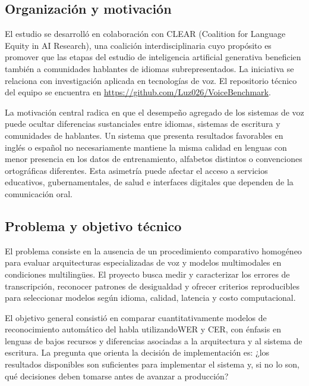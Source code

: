 \documentclass[11pt,letterpaper]{article}
\begin{document}
\subsection{Organización y motivación}
El estudio se desarrolló en colaboración con CLEAR (Coalition for Language Equity in AI Research), una coalición interdisciplinaria cuyo propósito es promover que las etapas del estudio de inteligencia artificial generativa beneficien también a comunidades hablantes de idiomas subrepresentados. La iniciativa se relaciona con investigación aplicada en tecnologías de voz. El repositorio técnico del equipo se encuentra en \url{https://github.com/Luz026/VoiceBenchmark}.

La motivación central radica en que el desempeño agregado de los sistemas de voz puede ocultar diferencias sustanciales entre idiomas, sistemas de escritura y comunidades de hablantes. Un sistema que presenta resultados favorables en inglés o español no necesariamente mantiene la misma calidad en lenguas con menor presencia en los datos de entrenamiento, alfabetos distintos o convenciones ortográficas diferentes. Esta asimetría puede afectar el acceso a servicios educativos, gubernamentales, de salud e interfaces digitales que dependen de la comunicación oral.

\subsection{Problema y objetivo técnico}
El problema consiste en la ausencia de un procedimiento comparativo homogéneo para evaluar arquitecturas especializadas de voz y modelos multimodales en condiciones multilingües. El proyecto busca medir y caracterizar los errores de transcripción, reconocer patrones de desigualdad y ofrecer criterios reproducibles para seleccionar modelos según idioma, calidad, latencia y costo computacional.

El objetivo general consistió en comparar cuantitativamente modelos de reconocimiento automático del habla utilizandoWER y CER, con énfasis en lenguas de bajos recursos y diferencias asociadas a la arquitectura y al sistema de escritura. La pregunta que orienta la decisión de implementación es: ¿los resultados disponibles son suficientes para implementar el sistema y, si no lo son, qué decisiones deben tomarse antes de avanzar a producción?
\end{document}
